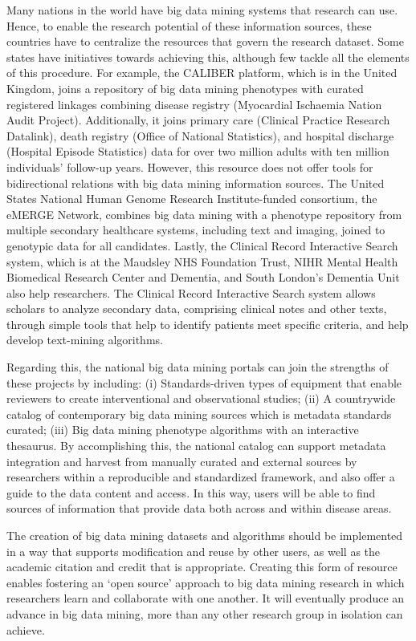 Many nations in the world have big data mining systems that research
can use.  Hence, to enable the research potential of these information
sources, these countries have to centralize the resources that govern
the research dataset. 
Some states have initiatives towards achieving this, although few
tackle all the elements of this procedure. 
For example, the CALIBER platform, which is in the United Kingdom,
joins a repository of big data mining phenotypes with curated
registered linkages combining disease registry (Myocardial Ischaemia
Nation Audit Project). 
Additionally, it joins primary care (Clinical Practice Research
Datalink), death registry (Office of National Statistics), and
hospital discharge (Hospital Episode Statistics) data for over two
million adults with ten million individuals’ follow-up years. 
However, this resource does not offer tools for bidirectional
relations with big data mining information sources. 
The United States National Human Genome Research Institute-funded
consortium, the eMERGE Network, combines big data mining with a
phenotype repository from multiple secondary healthcare systems,
including text and imaging, joined to genotypic data for all
candidates. 
Lastly, the Clinical Record Interactive Search system, which is at the
Maudsley NHS Foundation Trust, NIHR Mental Health Biomedical Research
Center and Dementia, and South London's Dementia Unit also help
researchers. 
The Clinical Record Interactive Search system allows scholars to
analyze secondary data, comprising clinical notes and other texts,
through simple tools that help to identify patients meet specific
criteria, and help develop text-mining algorithms. 
\par Regarding this, the national big data mining portals can join the
strengths of these projects by including: (i) Standards-driven types
of equipment that enable reviewers to create interventional and
observational studies; 
(ii) A countrywide catalog of contemporary big data mining sources
which is metadata standards curated; 
(iii)  Big data mining phenotype algorithms with an interactive
thesaurus. 
By accomplishing this, the national catalog can support metadata
integration and harvest from manually curated and external sources by
researchers within a reproducible and standardized framework, and also
offer a guide to the data content and access. 
In this way, users will be able to find sources of information that
provide data both across and within disease areas. 
\par The creation of big data mining datasets and algorithms should be
implemented in a way that supports modification and reuse by other
users, as well as the academic citation and credit that is
appropriate. Creating this form of resource enables fostering an `open
source' approach to big data mining research in which researchers
learn and collaborate with one another. It will eventually produce an
advance in big data mining, more than any other research group in
isolation can achieve.


